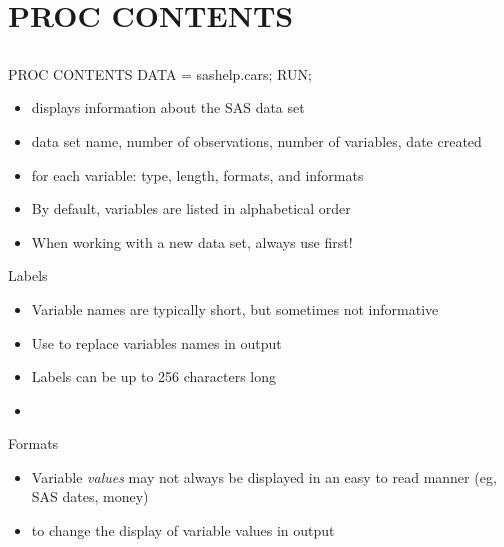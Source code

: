 \section[PROC CONTENTS]{PROC CONTENTS}
\subsection{}
\begin{frame}
\end{frame}

\begin{frame}[fragile]
\footnotesize
\begin{code}{.0}
PROC CONTENTS DATA = sashelp.cars;
RUN;
\end{code}
\emp
\vskip10pt
\begin{itemize}
    \item {} displays information about the SAS data set
    \bi
    \item data set name, number of observations, number of variables, date created
    \item for each variable: type, length, formats, and informats
    \ei
    \item By default, variables are listed in alphabetical order
    \item When working with a new data set, always use  first!
\end{itemize}
\end{frame}

\begin{frame}
Labels
\begin{itemize}
\item Variable names are typically short, but sometimes not informative
\item Use  to replace variables names in output
\item Labels can be up to 256 characters long
\item[]
\end{itemize}
Formats
\begin{itemize}
\item Variable \emph{values} may not always be displayed in an easy to read manner (eg, SAS dates, money)
\item {} to change the display of variable values in output
\end{itemize}
\end{frame}


